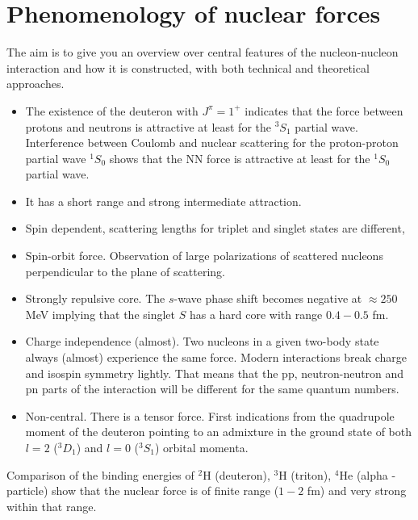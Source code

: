 \documentclass[graybox,sectrefs,envcountresetchap,open=right]{svmonodo}
\begin{document}
\section{Phenomenology of nuclear forces}

The aim is to give you an overview over central features of the nucleon-nucleon interaction and how it is constructed, with both technical and theoretical approaches. 

\begin{itemize}
\item The existence of the deuteron with $J^{\pi}=1^+$ indicates that the force between protons and neutrons is attractive at least for the $^3S_1$ partial wave. Interference between Coulomb and nuclear scattering for the proton-proton partial wave $^1S_0$ shows that  the NN force is attractive at least for the $^1S_0$ partial wave. 

\item It has a short range and strong intermediate attraction.

\item Spin dependent, scattering lengths for triplet and singlet states are different,

\item Spin-orbit force. Observation of large polarizations of scattered nucleons perpendicular to the plane of scattering.

\item Strongly repulsive core. The $s$-wave phase shift becomes negative at $\approx 250$ MeV implying that the singlet $S$ has a hard core with range $0.4-0.5$ fm. 

\item Charge independence (almost). Two nucleons in a given two-body state always (almost) experience the same force. Modern interactions break charge and isospin symmetry lightly. That means that the pp, neutron-neutron and pn parts of the interaction will be different for the same quantum numbers. 

\item Non-central. There is a tensor force. First indications from the quadrupole moment of the deuteron pointing to an admixture in the ground state of both $l=2$ ($^3D_1$) and $l=0$ ($^3S_1$) orbital momenta.
\end{itemize}

\noindent
Comparison of the binding energies of
${}^2\mbox{H}$ (deuteron), ${}^3\mbox{H}$ (triton), ${}^4\mbox{He}$ (alpha - particle) show that the nuclear force is of finite range ($1-2$ fm) and very strong within that range.
\end{document}
